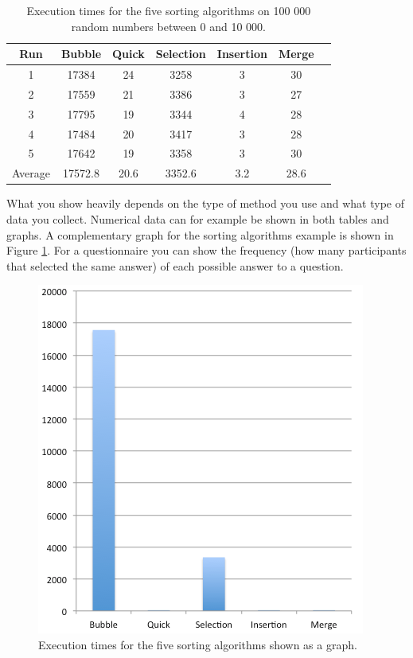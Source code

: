 \documentclass[a4paper,12pt]{article}
\begin{document}
\begin{center}
\begin{table}[ht]
\begin{center}
\begin{tabular}{ccccccc}
\hline
Run & Bubble & Quick & Selection & Insertion & Merge \\
\hline
1 & 17384 & 24 & 3258 & 3 & 30 \\
2 & 17559 & 21 & 3386 & 3 & 27 \\
3 & 17795 & 19 & 3344 & 4 & 28 \\
4 & 17484 & 20 & 3417 & 3 & 28 \\
5 & 17642 & 19 & 3358 & 3 & 30 \\
\hline
Average & 17572.8 & 20.6 & 3352.6 & 3.2 & 28.6 \\
\hline
%
\end{tabular}
\end{center}
\caption{Execution times for the five sorting algorithms on 100 000 random numbers between 0 and 10 000.}
\label{results}
\end{table}
\end{center}

What you show heavily depends on the type of method you use and what type of data you collect. Numerical data can for example be shown in both tables and graphs. A complementary graph for the sorting algorithms example is shown in Figure \ref{graph}. For a questionnaire you can show the frequency (how many participants that selected the same answer) of each possible answer to a question.

\begin{figure}[ht!]
\begin{center}
\includegraphics*[width=0.6\columnwidth]{img/graph}
\end{center}
\caption{Execution times for the five sorting algorithms shown as a graph.}
\label{graph}
\end{figure}
\end{document}
